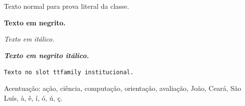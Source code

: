 \documentclass{abntexto-ufc}
\begin{document}
Texto normal para prova literal da classe.

\textbf{Texto em negrito.}

\textit{Texto em itálico.}

\textbf{\textit{Texto em negrito itálico.}}

\texttt{Texto no slot ttfamily institucional.}

Acentuação: ação, ciência, computação, orientação, avaliação, João, Ceará, São Luís, à, ê, í, ó, ú, ç.
\end{document}
